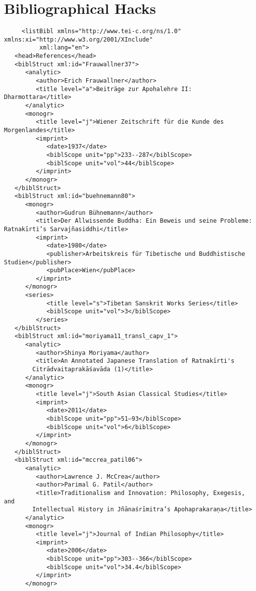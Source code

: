 \documentclass[article,12pt,a4paper]{memoir}%
\begin{document}
       \chapter{Bibliographical Hacks}
       \begin{verbatim}
     <listBibl xmlns="http://www.tei-c.org/ns/1.0" xmlns:xi="http://www.w3.org/2001/XInclude"
          xml:lang="en">
   <head>References</head>
   <biblStruct xml:id="Frauwallner37">
      <analytic>
         <author>Erich Frauwallner</author>
         <title level="a">Beiträge zur Apohalehre II: Dharmottara</title>
      </analytic>
      <monogr>
         <title level="j">Wiener Zeitschrift für die Kunde des Morgenlandes</title>
         <imprint>
            <date>1937</date>
            <biblScope unit="pp">233--287</biblScope>
            <biblScope unit="vol">44</biblScope>
         </imprint>
      </monogr>
   </biblStruct>
   <biblStruct xml:id="buehnemann80">
      <monogr>
         <author>Gudrun Bühnemann</author>
         <title>Der Allwissende Buddha: Ein Beweis und seine Probleme: Ratnakīrti’s Sarvajñasiddhi</title>
         <imprint>
            <date>1980</date>
            <publisher>Arbeitskreis für Tibetische und Buddhistische Studien</publisher>
            <pubPlace>Wien</pubPlace>
         </imprint>
      </monogr>
      <series>
	        <title level="s">Tibetan Sanskrit Works Series</title>
	        <biblScope unit="vol">3</biblScope>
	     </series>
   </biblStruct>
   <biblStruct xml:id="moriyama11_transl_capv_1">
      <analytic>
         <author>Shinya Moriyama</author>
         <title>An Annotated Japanese Translation of Ratnakīrti's
	    Citrādvaitaprakāśavāda (1)</title>
      </analytic>
      <monogr>
         <title level="j">South Asian Classical Studies</title>
         <imprint>
            <date>2011</date>
            <biblScope unit="pp">51–93</biblScope>
            <biblScope unit="vol">6</biblScope>
         </imprint>
      </monogr>
   </biblStruct>
   <biblStruct xml:id="mccrea_patil06">
      <analytic>
         <author>Lawrence J. McCrea</author>
         <author>Parimal G. Patil</author>
         <title>Traditionalism and Innovation: Philosophy, Exegesis, and
	    Intellectual History in Jñānaśrīmitra’s Apohaprakaraṇa</title>
      </analytic>
      <monogr>
         <title level="j">Journal of Indian Philosophy</title>
         <imprint>
            <date>2006</date>
            <biblScope unit="pp">303--366</biblScope>
            <biblScope unit="vol">34.4</biblScope>
         </imprint>
      </monogr>

\end{verbatim}
\end{document}
